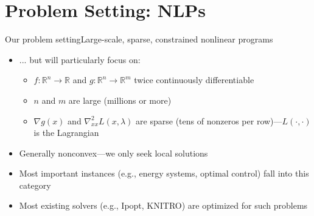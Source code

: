 \documentclass[aspectratio=169,11pt]{beamer}
\begin{document}
\section{Problem Setting: NLPs}
\begin{frame}{Our problem setting}{Large-scale, sparse, constrained nonlinear programs}
  \begin{itemize}
  \item {}
    ... but will particularly focus on:
    \begin{itemize}
    \item<2-> $f:\mathbb{R}^n\to\mathbb{R}$ and $g:\mathbb{R}^n\to\mathbb{R}^m$ twice continuously differentiable
    \item<3-> $n$ and $m$ are large (millions or more)
    \item<4-> $\nabla g(x)$ and $\nabla^2_{xx} L(x,\lambda)$ are \alert{sparse} (tens of nonzeros per row)---$L(\cdot,\cdot)$ is the Lagrangian
    \end{itemize}
  \item<6-> Generally \alert{nonconvex}---we only seek \alert{local solutions}
  \item<7-> Most important instances (e.g., energy systems, optimal control) fall into this category
  \item<8-> Most existing solvers (e.g., Ipopt, KNITRO) are optimized for such problems
  \end{itemize}
\end{frame}

\end{document}
